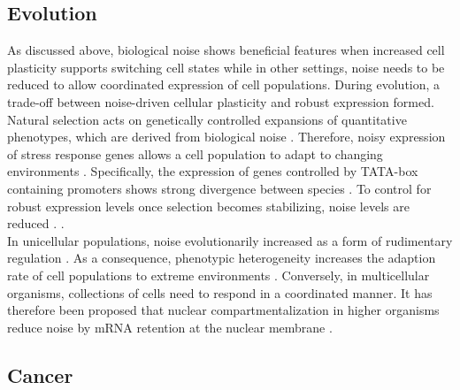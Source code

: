 \subsection{Evolution}

As discussed above, biological noise shows beneficial features when increased cell plasticity supports switching cell states while in other settings, noise needs to be reduced to allow coordinated expression of cell populations. During evolution, a trade-off between noise-driven cellular plasticity and robust expression formed. Natural selection acts on genetically controlled expansions of quantitative phenotypes, which are derived from biological noise \citep{Eldar2010}. Therefore, noisy expression of stress response genes allows a cell population to adapt to changing environments \citep{Lopez-Maury2009}. Specifically, the expression of genes controlled by TATA-box containing promoters shows strong divergence between species \citep{Tirosh2006}. To control for robust expression levels once selection becomes stabilizing, noise levels are reduced \citep{Lopez-Maury2009, Eldar2010, Pires2016}. . \\
In unicellular populations, noise evolutionarily increased as a form of rudimentary regulation \citep{Wolf2015}. As a consequence, phenotypic heterogeneity increases the adaption rate of cell populations to extreme environments \cite{Bodi2017}. Conversely, in multicellular organisms, collections of cells need to respond in a coordinated manner. It has therefore been proposed that nuclear compartmentalization in higher organisms reduce noise by mRNA retention at the nuclear membrane \citep{Battich2013, Stoeger2016}.

\subsection{Cancer}

